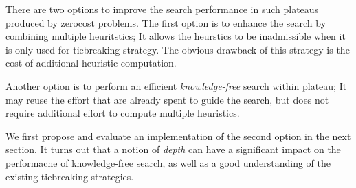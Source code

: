 There are two options to improve the search performance in such plateaus
produced by zerocost problems. The first option is to enhance the search
by combining multiple heuritstics; It allows the heurstics to be
inadmissible when it is only used for tiebreaking strategy. The obvious
drawback of this strategy is the cost of additional heuristic
computation.

Another option is to perform an efficient
\emph{knowledge-free} search within plateau; It may reuse the effort
that are already spent to guide the search, but does not require
additional effort to compute multiple heuristics.

We first propose and evaluate an implementation of the second option in
the next section.  It turns out that a notion of \emph{depth} can have
a significant impact on the performacne of knowledge-free search, as
well as a good understanding of the existing tiebreaking strategies.

